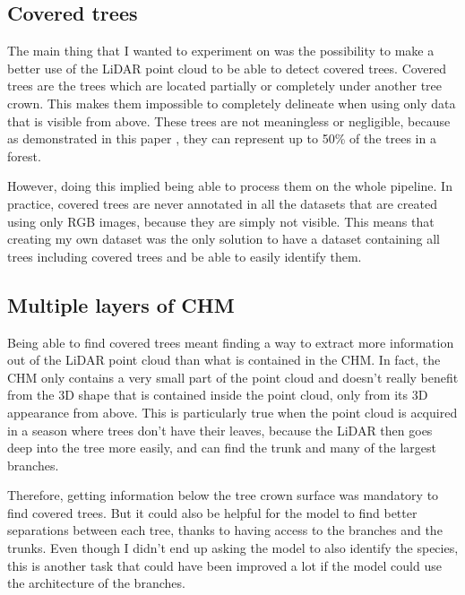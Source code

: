 \documentclass[
  letterpaper,
  DIV=11,
  numbers=noendperiod]{scrartcl}
\begin{document}
\subsection{Covered trees}\label{sec-obj-covered_trees}

The main thing that I wanted to experiment on was the possibility to
make a better use of the LiDAR point cloud to be able to detect covered
trees. Covered trees are the trees which are located partially or
completely under another tree crown. This makes them impossible to
completely delineate when using only data that is visible from above.
These trees are not meaningless or negligible, because as demonstrated
in this paper \autocite{lidar_benchmark_2}, they can represent up to
50\% of the trees in a forest.

However, doing this implied being able to process them on the whole
pipeline. In practice, covered trees are never annotated in all the
datasets that are created using only RGB images, because they are simply
not visible. This means that creating my own dataset was the only
solution to have a dataset containing all trees including covered trees
and be able to easily identify them.

\subsection{Multiple layers of CHM}\label{multiple-layers-of-chm}

Being able to find covered trees meant finding a way to extract more
information out of the LiDAR point cloud than what is contained in the
CHM. In fact, the CHM only contains a very small part of the point cloud
and doesn't really benefit from the 3D shape that is contained inside
the point cloud, only from its 3D appearance from above. This is
particularly true when the point cloud is acquired in a season where
trees don't have their leaves, because the LiDAR then goes deep into the
tree more easily, and can find the trunk and many of the largest
branches.

Therefore, getting information below the tree crown surface was
mandatory to find covered trees. But it could also be helpful for the
model to find better separations between each tree, thanks to having
access to the branches and the trunks. Even though I didn't end up
asking the model to also identify the species, this is another task that
could have been improved a lot if the model could use the architecture
of the branches.
\end{document}
